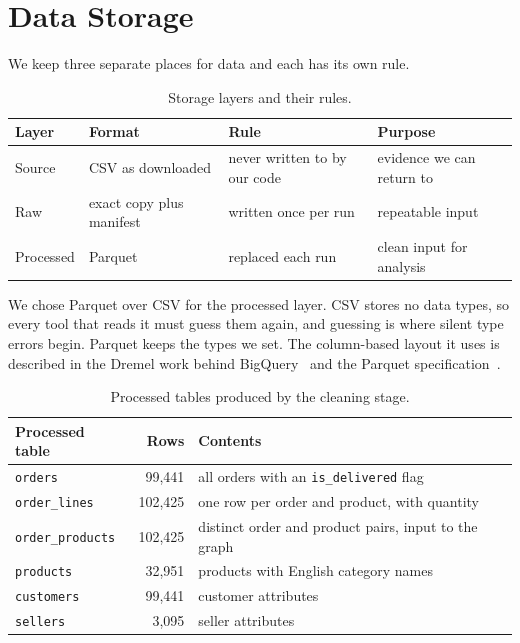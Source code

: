 \documentclass[11pt,a4paper]{article}
\newcommand{\code}[1]{\texttt{\small #1}}
\begin{document}
\section{Data Storage}
We keep three separate places for data and each has its own rule.

\begin{table}[h]
\centering\small
\begin{tabular}{@{}lp{3.0cm}p{4.2cm}p{4.4cm}@{}}
\toprule
\textbf{Layer} & \textbf{Format} & \textbf{Rule} & \textbf{Purpose} \\
\midrule
Source & CSV as downloaded & never written to by our code & evidence we can return to \\
Raw & exact copy plus manifest & written once per run & repeatable input \\
Processed & Parquet & replaced each run & clean input for analysis \\
\bottomrule
\end{tabular}
\caption{Storage layers and their rules.}
\end{table}

We chose Parquet over CSV for the processed layer. CSV stores no data types, so every tool that
reads it must guess them again, and guessing is where silent type errors begin. Parquet keeps
the types we set. The column-based layout it uses is described in the Dremel work behind
BigQuery~\cite{dremel} and the Parquet specification~\cite{parquet}.

\begin{table}[h]
\centering\small
\begin{tabular}{@{}lrp{8.8cm}@{}}
\toprule
\textbf{Processed table} & \textbf{Rows} & \textbf{Contents} \\
\midrule
\code{orders} & 99{,}441 & all orders with an \code{is\_delivered} flag \\
\code{order\_lines} & 102{,}425 & one row per order and product, with quantity \\
\code{order\_products} & 102{,}425 & distinct order and product pairs, input to the graph \\
\code{products} & 32{,}951 & products with English category names \\
\code{customers} & 99{,}441 & customer attributes \\
\code{sellers} & 3{,}095 & seller attributes \\
\bottomrule
\end{tabular}
\caption{Processed tables produced by the cleaning stage.}
\end{table}
\end{document}
